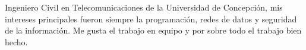 \par{
    Ingeniero Civil en Telecomunicaciones de la Universidad de Concepción, mis intereses principales fueron siempre la programación, redes de datos y seguridad de la información. Me gusta el trabajo en equipo y por sobre todo el trabajo bien hecho.
}